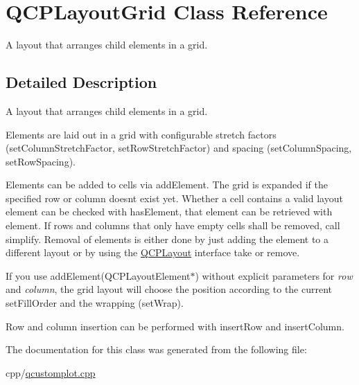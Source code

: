 \hypertarget{class_q_c_p_layout_grid}{}\section{Q\+C\+P\+Layout\+Grid Class Reference}
\label{class_q_c_p_layout_grid}


A layout that arranges child elements in a grid.  




\subsection{Detailed Description}
A layout that arranges child elements in a grid. 

Elements are laid out in a grid with configurable stretch factors (set\+Column\+Stretch\+Factor, set\+Row\+Stretch\+Factor) and spacing (set\+Column\+Spacing, set\+Row\+Spacing).

Elements can be added to cells via add\+Element. The grid is expanded if the specified row or column doesn\textquotesingle{}t exist yet. Whether a cell contains a valid layout element can be checked with has\+Element, that element can be retrieved with element. If rows and columns that only have empty cells shall be removed, call simplify. Removal of elements is either done by just adding the element to a different layout or by using the \mbox{\hyperlink{class_q_c_p_layout}{Q\+C\+P\+Layout}} interface take or remove.

If you use add\+Element(\+Q\+C\+P\+Layout\+Element$\ast$) without explicit parameters for {\itshape row} and {\itshape column}, the grid layout will choose the position according to the current set\+Fill\+Order and the wrapping (set\+Wrap).

Row and column insertion can be performed with insert\+Row and insert\+Column. 

The documentation for this class was generated from the following file\+:\begin{DoxyCompactItemize}
\item 
cpp/\mbox{\hyperlink{qcustomplot_8cpp}{qcustomplot.\+cpp}}\end{DoxyCompactItemize}
